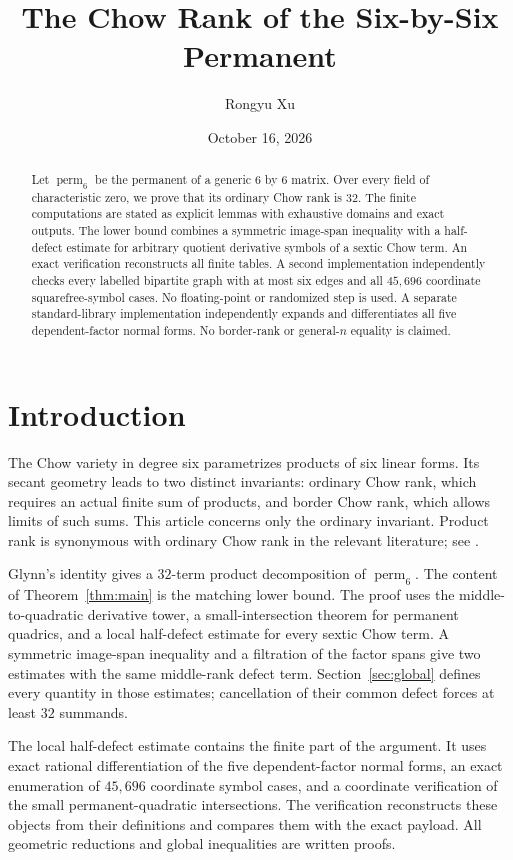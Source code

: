\documentclass[11pt]{amsart}
\title{The Chow Rank of the Six-by-Six Permanent}
\author{Rongyu Xu}
\date{October 16, 2026}
\newcommand{\perm}{\operatorname{perm}}
\theoremstyle{definition}
\begin{document}
\begin{abstract}
Let \(\perm_6\) be the permanent of a generic \(6\) by \(6\) matrix.
Over every field of characteristic zero, we prove that its
ordinary Chow rank is \(32\). The finite computations are stated as explicit
lemmas with exhaustive domains and exact
outputs. The lower bound combines a
symmetric image-span inequality with a half-defect estimate for arbitrary
quotient derivative symbols of a sextic Chow term. An exact verification
reconstructs all finite tables. A second implementation independently checks
every labelled bipartite graph with at most six edges and all \(45{,}696\)
coordinate squarefree-symbol cases. No floating-point or randomized step is
used. A separate standard-library implementation independently expands and
differentiates all five dependent-factor normal forms. No border-rank or
general-\(n\) equality is claimed.
\end{abstract}

\maketitle

\section{Introduction}

The Chow variety in degree six parametrizes products of six linear forms.
Its secant geometry leads to two distinct invariants: ordinary Chow rank,
which requires an actual finite sum of products, and border Chow rank, which
allows limits of such sums.  This article concerns only the ordinary invariant.
Product rank is synonymous with ordinary Chow rank in the relevant literature;
see \cite{IltenTeitler2016}.

Glynn's identity gives a \(32\)-term product decomposition of \(\perm_6\).
The content of Theorem~\ref{thm:main} is the matching lower bound.  The proof
uses the middle-to-quadratic derivative tower, a small-intersection theorem
for permanent quadrics, and a local half-defect estimate for every sextic Chow
term.  A symmetric image-span inequality and a filtration of the factor spans
give two estimates with the same middle-rank defect term. Section~\ref{sec:global}
defines every quantity in those estimates; cancellation of their common
defect forces at least \(32\) summands.

The local half-defect estimate contains the finite part of the argument.  It
uses exact rational differentiation of the five dependent-factor normal
forms, an exact enumeration of \(45{,}696\) coordinate symbol cases, and a
coordinate verification of the small permanent-quadratic intersections. The
verification reconstructs these objects from their definitions and compares
them with the exact payload. All geometric reductions and global inequalities
are written proofs.
\end{document}

